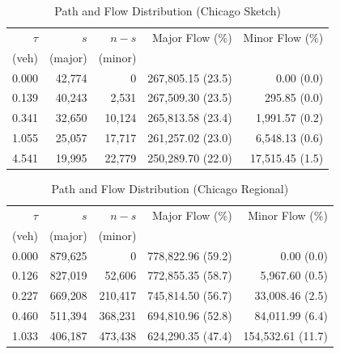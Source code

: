 \documentclass[11pt]{article}
\begin{document}
\begin{table}[ht]
\centering
\caption{Path and Flow Distribution (Chicago Sketch)}
\label{tab:pathflow-sketch}
{\small\begin{tabular}{rrrrr}
\toprule
$\tau$ & $s$ & $n - s$ & Major Flow (\%) & Minor Flow (\%) \\
(veh) & (major) & (minor) & & \\
\midrule
0.000 & 42{,}774 & 0 & 267{,}805.15 (23.5) & 0.00 (0.0) \\
0.139 & 40{,}243 & 2{,}531 & 267{,}509.30 (23.5) & 295.85 (0.0) \\
0.341 & 32{,}650 & 10{,}124 & 265{,}813.58 (23.4) & 1{,}991.57 (0.2) \\
1.055 & 25{,}057 & 17{,}717 & 261{,}257.02 (23.0) & 6{,}548.13 (0.6) \\
4.541 & 19{,}995 & 22{,}779 & 250{,}289.70 (22.0) & 17{,}515.45 (1.5) \\
\bottomrule
\end{tabular}}
\end{table}
 
\begin{table}[ht]
\centering
\caption{Path and Flow Distribution (Chicago Regional)}
\label{tab:pathflow-regional}
{\small\begin{tabular}{rrrrr}
\toprule
$\tau$ & $s$ & $n - s$ & Major Flow (\%) & Minor Flow (\%) \\
(veh) & (major) & (minor) &  &  \\
\midrule
0.000 & 879{,}625 & 0 & 778{,}822.96 (59.2) & 0.00 (0.0) \\
0.126 & 827{,}019 & 52{,}606 & 772{,}855.35 (58.7) & 5{,}967.60 (0.5) \\
0.227 & 669{,}208 & 210{,}417 & 745{,}814.50 (56.7) & 33{,}008.46 (2.5) \\
0.460 & 511{,}394 & 368{,}231 & 694{,}810.96 (52.8) & 84{,}011.99 (6.4) \\
1.033 & 406{,}187 & 473{,}438 & 624{,}290.35 (47.4) & 154{,}532.61 (11.7) \\
\bottomrule
\end{tabular}}
\end{table}
 
\end{document}
